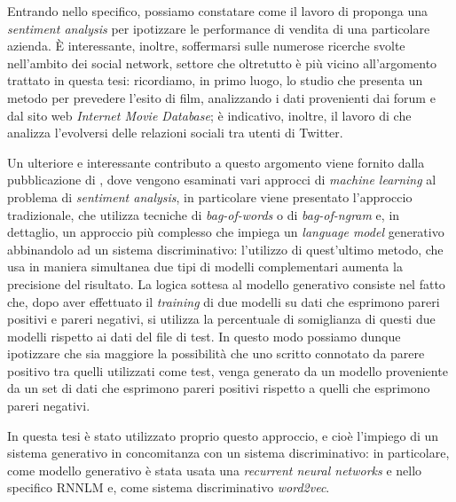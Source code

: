 \documentclass[a4paper,12pt,openright,twoside]{report}
\theoremstyle{definition}
\begin{document}
Entrando nello specifico, possiamo constatare come il lavoro di \cite{Liu2007}
proponga una \emph{sentiment analysis} per ipotizzare le performance di vendita di una particolare
azienda. 
\`E interessante, inoltre, soffermarsi sulle numerose ricerche svolte nell’ambito dei social network, 
settore che oltretutto è più vicino all’argomento trattato in questa tesi: ricordiamo, in primo luogo,  lo studio 
\cite{Yano2010}
che presenta un metodo per prevedere l'esito di film, analizzando i dati
provenienti dai forum e dal sito web \emph{Internet Movie Database}; è indicativo, inoltre,
il lavoro di
\cite{Groh2011}
che analizza l’evolversi delle relazioni sociali tra utenti di Twitter.

Un ulteriore e interessante contributo a questo argomento viene fornito 
dalla pubblicazione di \cite{Ens2015}, dove vengono esaminati vari
approcci di \emph{machine learning} al problema di \emph{sentiment analysis},
in particolare viene presentato l'approccio tradizionale, che utilizza tecniche di
\emph{bag-of-words} o di \emph{bag-of-ngram} \citep{Man2008, Pang2008}
e, in dettaglio, un approccio più complesso che impiega un \emph{language model} generativo
abbinandolo ad un sistema discriminativo: 
l’utilizzo di quest’ultimo metodo, che usa in maniera simultanea due tipi di modelli complementari
aumenta la precisione del risultato.
La logica sottesa al modello generativo consiste nel fatto che, dopo aver effettuato il \emph{training}
di due modelli su dati che esprimono pareri positivi e pareri negativi,
si utilizza la percentuale di somiglianza di questi due modelli rispetto ai dati del file di
test. In questo modo 
possiamo dunque ipotizzare che sia maggiore la possibilità che uno scritto connotato 
da parere positivo tra quelli utilizzati come test, venga generato da un modello proveniente 
da un set di dati che esprimono pareri positivi rispetto a quelli che esprimono pareri negativi.

In questa tesi è stato utilizzato proprio questo approccio, 
e cioè l’impiego di un sistema generativo in concomitanza con un sistema discriminativo:
in particolare, come modello generativo  è stata usata una \emph{recurrent neural networks} 
\- e nello specifico RNNLM \- e, come sistema discriminativo \emph{word2vec}.
\end{document}
